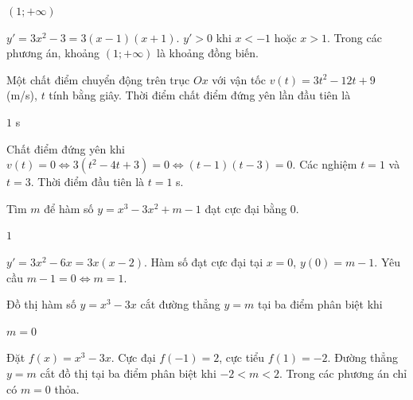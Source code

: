 \documentclass{exam}
\begin{document}
\begin{dapan}
$(1; +\infty)$
\end{dapan}


\begin{loigiai}
$y' = 3x^2 - 3 = 3(x-1)(x+1)$. $y' > 0$ khi $x < -1$ hoặc $x > 1$. Trong các phương án, khoảng $(1; +\infty)$ là khoảng đồng biến.
\end{loigiai}



\begin{question}
Một chất điểm chuyển động trên trục $Ox$ với vận tốc $v(t) = 3t^2 - 12t + 9$ (m/s), $t$ tính bằng giây. Thời điểm chất điểm đứng yên lần đầu tiên là





\end{question}

\begin{dapan}
$1$ s
\end{dapan}


\begin{loigiai}
Chất điểm đứng yên khi $v(t) = 0 \Leftrightarrow 3(t^2 - 4t + 3) = 0 \Leftrightarrow (t-1)(t-3) = 0$. Các nghiệm $t = 1$ và $t = 3$. Thời điểm đầu tiên là $t = 1$ s.
\end{loigiai}



\begin{question}
Tìm $m$ để hàm số $y = x^3 - 3x^2 + m - 1$ đạt cực đại bằng $0$.





\end{question}

\begin{dapan}
$1$
\end{dapan}


\begin{loigiai}
$y' = 3x^2 - 6x = 3x(x-2)$. Hàm số đạt cực đại tại $x = 0$, $y(0) = m - 1$. Yêu cầu $m - 1 = 0 \Leftrightarrow m = 1$.
\end{loigiai}



\begin{question}
Đồ thị hàm số $y = x^3 - 3x$ cắt đường thẳng $y = m$ tại ba điểm phân biệt khi





\end{question}

\begin{dapan}
$m = 0$
\end{dapan}


\begin{loigiai}
Đặt $f(x) = x^3 - 3x$. Cực đại $f(-1) = 2$, cực tiểu $f(1) = -2$. Đường thẳng $y = m$ cắt đồ thị tại ba điểm phân biệt khi $-2 < m < 2$. Trong các phương án chỉ có $m = 0$ thỏa.
\end{loigiai}
\end{document}
